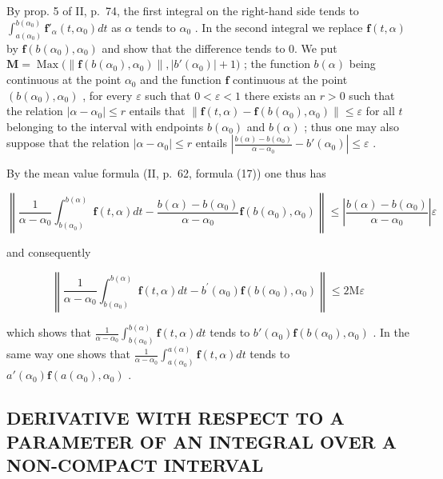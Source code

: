 By prop. 5 of II, p.~74, the first integral on the right-hand side tends to \(\int_{a(\alpha_0)}^{b(\alpha_0)} \mathbf{f}'_\alpha(t, \alpha_0) dt\) as \(\alpha\) tends to \(\alpha_0\) . In the second integral we replace \(\mathbf{f}(t, \alpha)\) by \(\mathbf{f}(b(\alpha_0), \alpha_0)\) and show that the difference tends to 0. We put \(\mathbf{M} = \operatorname{Max}\big( \| \mathbf{f}(b(\alpha_0), \alpha_0) \|, |b'(\alpha_0)| + 1 \big)\) ; the function \(b(\alpha)\) being continuous at the point \(\alpha_0\) and the function \(\mathbf{f}\) continuous at the point \((b(\alpha_0), \alpha_0)\) , for every \(\varepsilon\) such that \(0 < \varepsilon < 1\) there exists an \(r > 0\) such that the relation \(|\alpha - \alpha_0| \leqslant r\) entails that \(\| \mathbf{f}(t, \alpha) - \mathbf{f}(b(\alpha_0), \alpha_0) \| \leqslant \varepsilon\) for all \(t\) belonging to the interval with endpoints \(b(\alpha_0)\) and \(b(\alpha)\) ; thus one may also suppose that the relation \(|\alpha - \alpha_0| \leqslant r\) entails \(\left| \frac{b(\alpha) - b(\alpha_0)}{\alpha - \alpha_0} - b'(\alpha_0) \right| \leqslant \varepsilon\) .

By the mean value formula (II, p.~62, formula (17)) one thus has

\[
\left\| \frac {1}{\alpha - \alpha_ {0}} \int_ {b (\alpha_ {0})} ^ {b (\alpha)} \mathbf {f} (t, \alpha) d t - \frac {b (\alpha) - b (\alpha_ {0})}{\alpha - \alpha_ {0}} \mathbf {f} (b (\alpha_ {0}), \alpha_ {0}) \right\| \leqslant \left| \frac {b (\alpha) - b (\alpha_ {0})}{\alpha - \alpha_ {0}} \right| \varepsilon
\]

and consequently

\[
\left\| \frac {1}{\alpha - \alpha_ {0}} \int_ {b (\alpha_ {0})} ^ {b (\alpha)} \mathbf {f} (t, \alpha) d t - b ^ {\prime} (\alpha_ {0}) \mathbf {f} (b (\alpha_ {0}), \alpha_ {0}) \right\| \leqslant 2 \mathrm{M} \varepsilon
\]

which shows that \(\frac{1}{\alpha - \alpha_0} \int_{b(\alpha_0)}^{b(\alpha)} \mathbf{f}(t, \alpha) dt\) tends to \(b'(\alpha_0)\mathbf{f}(b(\alpha_0), \alpha_0)\) . In the same way one shows that \(\frac{1}{\alpha - \alpha_0} \int_{a(\alpha_0)}^{a(\alpha)} \mathbf{f}(t, \alpha) dt\) tends to \(a'(\alpha_0)\mathbf{f}(a(\alpha_0), \alpha_0)\) .

\subsection{DERIVATIVE WITH RESPECT TO A PARAMETER OF AN INTEGRAL OVER A NON-COMPACT INTERVAL}

